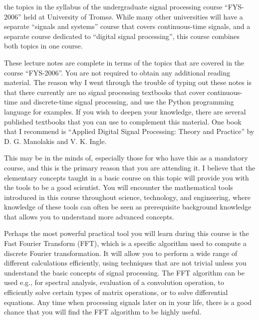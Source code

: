  the topics in the syllabus of the
undergraduate signal processing course ``FYS-2006'' held at University
of Troms\o{}. While many other universities will have a separate
``signals and systems'' course that covers continuous-time signals,
and a separate course dedicated to ``digital signal processing'', this
course combines both topics in one course.

These lecture notes are complete in terms of the topics that are
covered in the course ``FYS-2006''. You are not required to obtain any
additional reading material. The reason why I went through the trouble
of typing out these notes is that there currently are no signal
processing textbooks that cover continuous-time and discrete-time
signal processing, and use the Python programming language for
examples. If you wish to deepen your knowledge, there are several
published textbooks that you can use to complement this material. One
book that I recommend is ``Applied Digital Signal Processing: Theory
and Practice'' by D. G. Manolakis and V. K. Ingle.




This may be in the minds of, especially those for who have this as a mandatory course,
and this is the primary reason that you are attending it.
I believe that the elementary concepts taught in a basic course on this topic will provide
you with the tools to be a good scientist. You will encounter the mathematical tools
introduced in this course throughout science, technology, and engineering, where knowledge
of these tools can often be seen as prerequisite background knowledge
that allows you to understand more advanced concepts.

Perhaps the most powerful practical tool you will learn during this course
is the Fast Fourier Transform (FFT), which is a specific algorithm used to compute a
discrete Fourier transformation. It will allow you to perform a wide range of different
calculations efficiently, using techniques that are not trivial unless you understand the
basic concepts of signal processing. The FFT algorithm can be used e.g., for spectral analysis,
evaluation of a convolution operation, to efficiently solve certain types of matrix operations,
or to solve differential equations. Any time when processing signals
later on in your life, there is a good chance that you will find the FFT algorithm to be highly useful.


